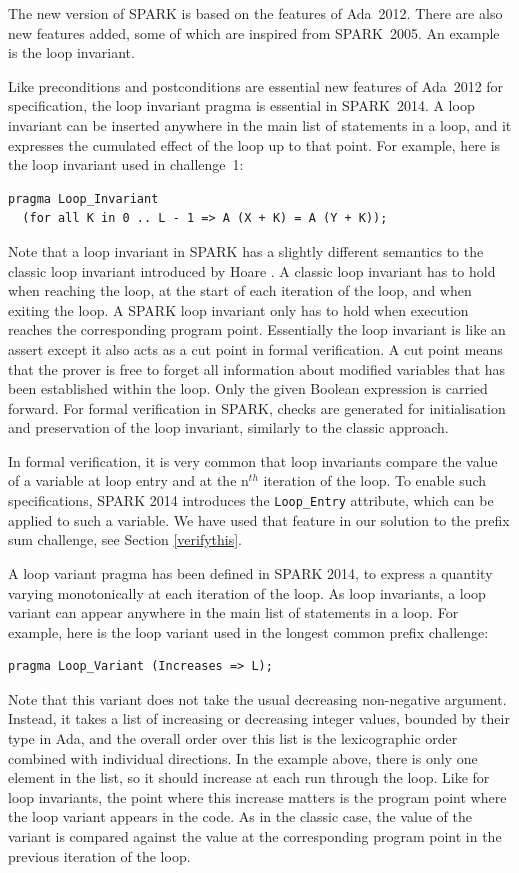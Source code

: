 \documentclass[sttt,final]{svjour}
\newcommand{\oldspark}{SPARK~2005\xspace}
\newcommand{\newspark}{SPARK~2014\xspace}
\newcommand{\adatwtw}{Ada~2012\xspace}
\begin{document}
The new version of SPARK is based on the features of \adatwtw. There
are also new features added, some of which are inspired from
\oldspark. An example is the loop invariant.

Like preconditions and postconditions are essential new features of
\adatwtw for specification, the loop invariant pragma is essential in
\newspark. A loop invariant can be inserted anywhere in the main list
of statements in a loop, and it expresses the cumulated effect of the
loop up to that point. For example, here is the loop invariant used in
challenge~1:
%
\begin{lstlisting}
pragma Loop_Invariant
  (for all K in 0 .. L - 1 => A (X + K) = A (Y + K));
\end{lstlisting}
%
Note that a loop invariant in SPARK has a slightly different semantics
to the classic loop invariant introduced by Hoare
\cite{hoare69cacm}. A classic loop invariant has to hold when reaching
the loop, at the start of each iteration of the loop, and when exiting
the loop. A SPARK loop invariant only has to hold when execution
reaches the corresponding program point. Essentially the loop
invariant is like an assert except it also acts as a cut point in
formal verification. A cut point means that the prover is free to
forget all information about modified variables that has been
established within the loop. Only the given Boolean expression is
carried forward. For formal verification in SPARK, checks are
generated for initialisation and preservation of the loop invariant,
similarly to the classic approach.

In formal verification, it is very common that loop invariants compare
the value of a variable at loop entry and at the n$^{th}$ iteration of
the loop. To enable such specifications, SPARK 2014 introduces the
\verb|Loop_Entry| attribute, which can be applied to such a
variable. We have used that feature in our solution to the prefix sum
challenge, see Section \ref{verifythis}.

A loop variant pragma has been defined in SPARK 2014, to express
a quantity varying monotonically at each iteration of the loop. As
loop invariants, a loop variant can appear anywhere in the main list
of statements in a loop. For example, here is the loop variant used in
the longest common prefix challenge:
%
\begin{lstlisting}
pragma Loop_Variant (Increases => L);
\end{lstlisting}
%
Note that this variant does not take the usual decreasing non-negative
argument. Instead, it takes a list of increasing or decreasing integer
values, bounded by their type in Ada, and the overall order over this
list is the lexicographic order combined with individual
directions. In the example above, there is only one element in the
list, so it should increase at each run through the loop. Like for
loop invariants, the point where this increase matters is the program
point where the loop variant appears in the code. As in the classic
case, the value of the variant is compared against the value at the
corresponding program point in the previous iteration of the loop.
\end{document}
